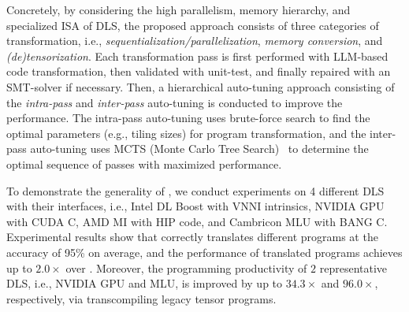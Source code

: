 Concretely, by considering the high parallelism, memory hierarchy, and specialized ISA of DLS, the proposed approach consists of three categories of transformation, i.e., \emph{sequentialization/parallelization}, \emph{memory conversion}, and \emph{(de)tensorization}. Each transformation pass is first performed with LLM-based code transformation, then validated with unit-test, and finally repaired with an SMT-solver if necessary. 
Then, a hierarchical auto-tuning approach consisting of the \emph{intra-pass} and \emph{inter-pass} auto-tuning is conducted to improve the performance. The intra-pass auto-tuning uses brute-force search to find the optimal parameters (e.g., tiling sizes) for program transformation, and the inter-pass auto-tuning uses MCTS (Monte Carlo Tree Search)~\cite{6145622} to determine the optimal sequence of passes with maximized performance.


To demonstrate the generality of \name{}, we conduct experiments on 4 different DLS with their interfaces, i.e.,  Intel DL Boost with
VNNI intrinsics, NVIDIA GPU with CUDA C, AMD MI with HIP code, and
Cambricon MLU with BANG C. Experimental results show that \name{} correctly translates different programs at the accuracy of 95\% on average, 
and the performance of translated programs achieves up to $2.0\times$ over .
Moreover, the programming productivity of $2$ representative DLS, i.e., NVIDIA GPU and MLU, is improved by up to $34.3\times$ and $96.0\times$, respectively, via transcompiling legacy tensor programs.

